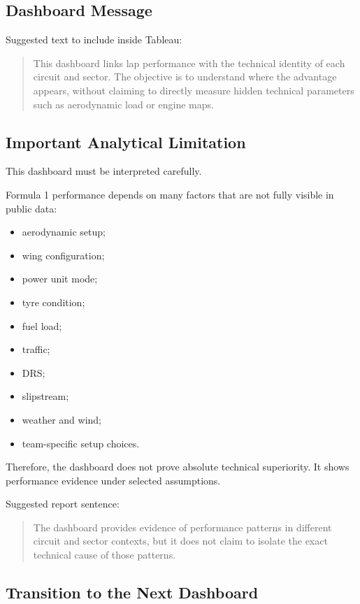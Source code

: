 \documentclass[12pt,a4paper]{article}
\begin{document}
	\subsection{Dashboard Message}
	
	Suggested text to include inside Tableau:
	
	\begin{quote}
		This dashboard links lap performance with the technical identity of each circuit and sector. The objective is to understand where the advantage appears, without claiming to directly measure hidden technical parameters such as aerodynamic load or engine maps.
	\end{quote}
	
	\subsection{Important Analytical Limitation}
	
	This dashboard must be interpreted carefully.
	
	Formula 1 performance depends on many factors that are not fully visible in public data:
	
	\begin{itemize}[leftmargin=1.2cm]
		\item aerodynamic setup;
		\item wing configuration;
		\item power unit mode;
		\item tyre condition;
		\item fuel load;
		\item traffic;
		\item DRS;
		\item slipstream;
		\item weather and wind;
		\item team-specific setup choices.
	\end{itemize}
	
	Therefore, the dashboard does not prove absolute technical superiority.
	It shows performance evidence under selected assumptions.
	
	Suggested report sentence:
	
	\begin{quote}
		The dashboard provides evidence of performance patterns in different circuit and sector contexts, but it does not claim to isolate the exact technical cause of those patterns.
	\end{quote}
	
	\subsection{Transition to the Next Dashboard}
	
\end{document}

